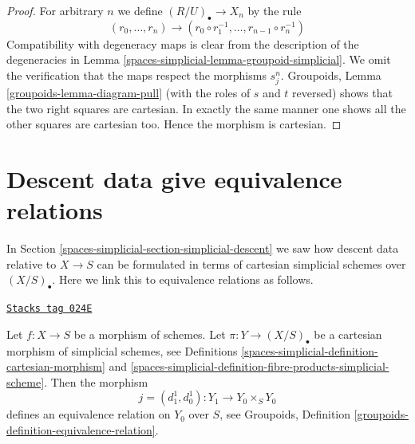\begin{proof}
For arbitrary $n$ we define $(R/U)_\bullet \to X_n$ by the rule
$$
(r_0, \ldots, r_n)
\longrightarrow
(r_0 \circ r_1^{-1}, \ldots, r_{n - 1} \circ r_n^{-1})
$$
Compatibility with degeneracy maps is clear from the description of the
degeneracies in Lemma \ref{spaces-simplicial-lemma-groupoid-simplicial}.
We omit the verification that the maps respect the morphisms $s^n_j$.
Groupoids, Lemma \ref{groupoids-lemma-diagram-pull}
(with the roles of $s$ and $t$ reversed)
shows that the two right squares are cartesian. In exactly the same manner
one shows all the other squares are cartesian too. Hence
the morphism is cartesian.
\end{proof}

\section{Descent data give equivalence relations}
\label{spaces-simplicial-section-equivalence-relation}
In Section \ref{spaces-simplicial-section-simplicial-descent} we saw how descent data relative to
$X \to S$ can be formulated in terms of cartesian simplicial
schemes over $(X/S)_\bullet$. Here we link this to equivalence
relations as follows.

\begin{lemma}
\label{spaces-simplicial-lemma-equivalence-relation}
\href{https://stacks.math.columbia.edu/tag/024E}{\texttt{Stacks tag 024E}}

Let $f : X \to S$ be a morphism of schemes.
Let $\pi : Y \to (X/S)_\bullet$ be a cartesian morphism of simplicial
schemes, see Definitions \ref{spaces-simplicial-definition-cartesian-morphism} and
\ref{spaces-simplicial-definition-fibre-products-simplicial-scheme}.
Then the morphism
$$
j = (d^1_1, d^1_0) : Y_1 \to Y_0 \times_S Y_0
$$
defines an equivalence relation on $Y_0$ over $S$,
see Groupoids, Definition \ref{groupoids-definition-equivalence-relation}.
\end{lemma}

